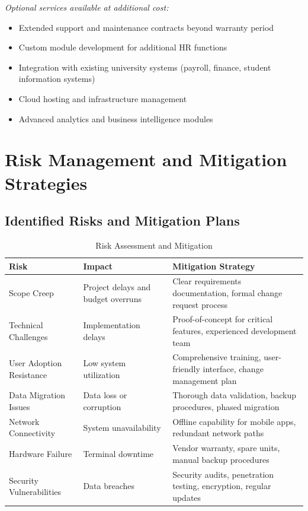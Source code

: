 \documentclass[12pt]{article}
\begin{document}
\textit{Optional services available at additional cost:}
\begin{itemize}[noitemsep]
\item Extended support and maintenance contracts beyond warranty period
\item Custom module development for additional HR functions
\item Integration with existing university systems (payroll, finance, student information systems)
\item Cloud hosting and infrastructure management
\item Advanced analytics and business intelligence modules
\end{itemize}

\section{Risk Management and Mitigation Strategies}

\subsection{Identified Risks and Mitigation Plans}

\begin{table}[h!]
\centering
\small
\begin{tabularx}{\textwidth}{p{3.5cm}Xp{4cm}}
\toprule
\textbf{Risk} & \textbf{Impact} & \textbf{Mitigation Strategy} \\
\midrule
Scope Creep & Project delays and budget overruns & Clear requirements documentation, formal change request process \\
\midrule
Technical Challenges & Implementation delays & Proof-of-concept for critical features, experienced development team \\
\midrule
User Adoption Resistance & Low system utilization & Comprehensive training, user-friendly interface, change management plan \\
\midrule
Data Migration Issues & Data loss or corruption & Thorough data validation, backup procedures, phased migration \\
\midrule
Network Connectivity & System unavailability & Offline capability for mobile apps, redundant network paths \\
\midrule
Hardware Failure & Terminal downtime & Vendor warranty, spare units, manual backup procedures \\
\midrule
Security Vulnerabilities & Data breaches & Security audits, penetration testing, encryption, regular updates \\
\bottomrule
\end{tabularx}
\caption{Risk Assessment and Mitigation}
\end{table}
\end{document}
